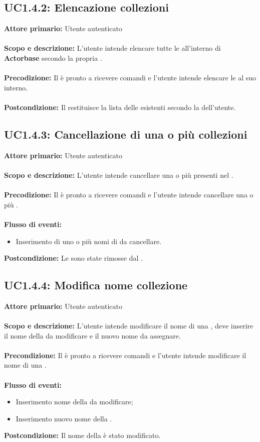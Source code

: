 \documentclass{scalatekids-article}
\begin{document}
\subsection{UC1.4.2: Elencazione collezioni}
\textbf{Attore primario:} Utente autenticato\\ \\
\textbf{Scopo e descrizione:} L'utente intende elencare tutte le  all'interno di \textbf{Actorbase} secondo la propria .\\ \\
\textbf{Precodizione:} Il  è pronto a ricevere comandi e l'utente intende elencare le  al suo interno.\\ \\
\textbf{Postcondizione:} Il  restituisce la lista delle  esistenti secondo la  dell'utente.
\subsection{UC1.4.3: Cancellazione di una o più collezioni}
\textbf{Attore primario:} Utente autenticato\\ \\
\textbf{Scopo e descrizione:} L’utente intende cancellare una o più  presenti nel .\\ \\
\textbf{Precodizione:} Il  è pronto a ricevere comandi e l’utente intende cancellare una o più .\\ \\
\textbf{Flusso di eventi:}
\begin{itemize}
\item Inserimento di uno o più nomi di  da cancellare.
\end{itemize}
\textbf{Postcondizione:} Le  sono state rimosse dal .
\subsection{UC1.4.4: Modifica nome collezione}
\textbf{Attore primario:} Utente autenticato \\ \\
\textbf{Scopo e descrizione:} L’utente intende modificare il nome di una , deve inserire il nome della  da modificare e il nuovo nome da assegnare. \\ \\
\textbf{Precondizione:} Il  è pronto a ricevere comandi e l’utente intende modificare il nome di una .\\ \\
\textbf{Flusso di eventi:}
\begin{itemize}
\item Inserimento nome della  da modificare;
\item Inserimento nuovo nome della .
\end{itemize}
\textbf{Postcondizione:} Il nome della  è stato modificato.
\end{document}
